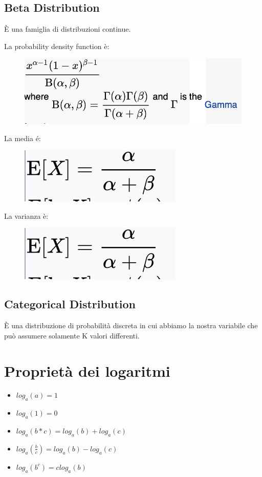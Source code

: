 \documentclass[14pt]{extreport}
\begin{document}
\subsection{Beta Distribution}

È una famiglia di distribuzioni continue.

La probability density function è:

\begin{figure}[H]
\centering
\includegraphics[width=0.5\linewidth]{124.jpeg}
\end{figure}

La media é:
\begin{figure}[H]
\centering
\includegraphics[width=0.4\linewidth]{125.jpeg}
\end{figure}

La varianza è:
\begin{figure}[H]
\centering
\includegraphics[width=0.4\linewidth]{125.jpeg}
\end{figure}

\subsection{Categorical Distribution}

È una distribuzione di probabilità discreta in cui abbiamo la nostra variabile che può assumere solamente K valori differenti.


\section{Proprietà dei logaritmi}

\begin{itemize}
\item $log_a(a) = 1$
\item $log_a(1) = 0$
\item $log_a(b*c) = log_a(b)+log_a(c)$
\item $log_a(\frac{b}{c}) = log_a(b)-log_a(c)$ 
\item $log_a(b^c) = clog_a(b)$
\end{itemize}
\end{document}
